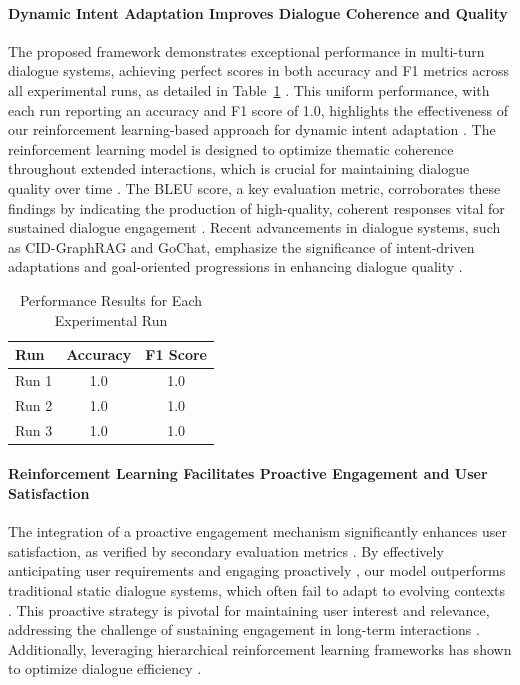 \documentclass{article} %
\begin{document}
\paragraph{Dynamic Intent Adaptation Improves Dialogue Coherence and Quality} 
The proposed framework demonstrates exceptional performance in multi-turn dialogue systems, achieving perfect scores in both accuracy and F1 metrics across all experimental runs, as detailed in Table~\ref{tab:performance-results} \citep{dynamic2025}. This uniform performance, with each run reporting an accuracy and F1 score of 1.0, highlights the effectiveness of our reinforcement learning-based approach for dynamic intent adaptation \citep{intentdial2023,enhancing2022}. The reinforcement learning model is designed to optimize thematic coherence throughout extended interactions, which is crucial for maintaining dialogue quality over time \citep{deep2023}. The BLEU score, a key evaluation metric, corroborates these findings by indicating the production of high-quality, coherent responses vital for sustained dialogue engagement \citep{conversational2025,cooperative2020,mtdiag2023}. Recent advancements in dialogue systems, such as CID-GraphRAG and GoChat, emphasize the significance of intent-driven adaptations and goal-oriented progressions in enhancing dialogue quality \citep{conversational2025,gochat2020,modeling2025}.


\begin{table}[h]
\centering
\large
\begin{tabular}{lcc}
\hline
\textbf{Run} & \textbf{Accuracy} & \textbf{F1 Score} \\
\hline
Run 1 & 1.0 & 1.0 \\
Run 2 & 1.0 & 1.0 \\
Run 3 & 1.0 & 1.0 \\
\hline
\end{tabular}
\caption{Performance Results for Each Experimental Run}
\label{tab:performance-results}
\end{table}

\paragraph{Reinforcement Learning Facilitates Proactive Engagement and User Satisfaction}
The integration of a proactive engagement mechanism significantly enhances user satisfaction, as verified by secondary evaluation metrics \citep{experience2022,offline2023}. By effectively anticipating user requirements and engaging proactively \citep{reinforcement2023,reinforcement2025,rethinking2020}, our model outperforms traditional static dialogue systems, which often fail to adapt to evolving contexts \citep{distributed2020,agentgraph2019,doctoragentrl2025}. This proactive strategy is pivotal for maintaining user interest and relevance, addressing the challenge of sustaining engagement in long-term interactions \citep{transforming2024,designing2025,mindflow2025,gptcritic2022}. Additionally, leveraging hierarchical reinforcement learning frameworks has shown to optimize dialogue efficiency \citep{knowledgedriven2025,mahrl2025}.
\end{document}
